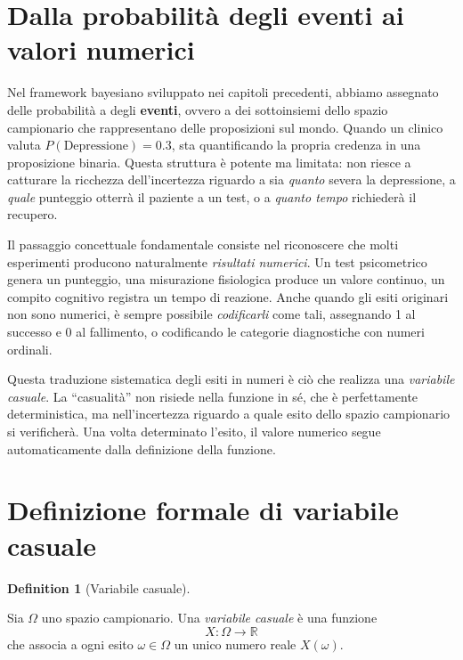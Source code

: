 \documentclass[
  letterpaper,
  DIV=11,
  numbers=noendperiod,
  oneside]{scrreprt}
\theoremstyle{definition}
\theoremstyle{plain}
\theoremstyle{definition}
\newtheorem{definition}{Definition}[chapter]
\theoremstyle{remark}
\begin{document}
\section{Dalla probabilità degli eventi ai valori
numerici}\label{dalla-probabilituxe0-degli-eventi-ai-valori-numerici}

Nel framework bayesiano sviluppato nei capitoli precedenti, abbiamo
assegnato delle probabilità a degli \textbf{eventi}, ovvero a dei
sottoinsiemi dello spazio campionario che rappresentano delle
proposizioni sul mondo. Quando un clinico valuta
\(P(\text{Depressione}) = 0.3\), sta quantificando la propria credenza
in una proposizione binaria. Questa struttura è potente ma limitata: non
riesce a catturare la ricchezza dell'incertezza riguardo a sia
\emph{quanto} severa la depressione, a \emph{quale} punteggio otterrà il
paziente a un test, o a \emph{quanto tempo} richiederà il recupero.

Il passaggio concettuale fondamentale consiste nel riconoscere che molti
esperimenti producono naturalmente \emph{risultati numerici}. Un test
psicometrico genera un punteggio, una misurazione fisiologica produce un
valore continuo, un compito cognitivo registra un tempo di reazione.
Anche quando gli esiti originari non sono numerici, è sempre possibile
\emph{codificarli} come tali, assegnando 1 al successo e 0 al
fallimento, o codificando le categorie diagnostiche con numeri ordinali.

Questa traduzione sistematica degli esiti in numeri è ciò che realizza
una \emph{variabile casuale}. La ``casualità'' non risiede nella
funzione in sé, che è perfettamente deterministica, ma nell'incertezza
riguardo a quale esito dello spazio campionario si verificherà. Una
volta determinato l'esito, il valore numerico segue automaticamente
dalla definizione della funzione.

\section{Definizione formale di variabile
casuale}\label{definizione-formale-di-variabile-casuale}

\begin{definition}[Variabile
casuale]\protect\hypertarget{def-random-variable}{}\label{def-random-variable}

Sia \(\Omega\) uno spazio campionario. Una \emph{variabile casuale} è
una funzione \[
X : \Omega \longrightarrow \mathbb{R}
\] che associa a ogni esito \(\omega \in \Omega\) un unico numero reale
\(X(\omega)\).

\end{definition}
\end{document}
